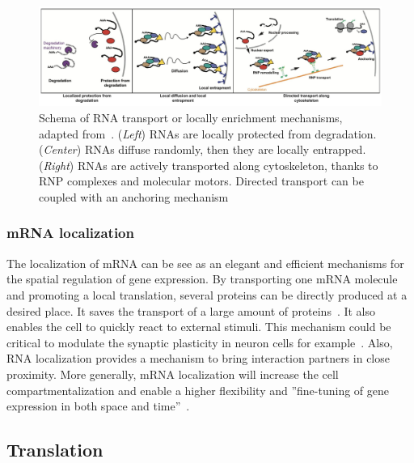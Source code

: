 \begin{figure}[]
    \centering
    \includegraphics[width=\textwidth]{figures/introduction/rna_transport}
    \caption[Schema of RNA transport or locally enrichment mechanisms]{Schema of RNA transport or locally enrichment mechanisms, adapted from~\cite{Medioni_2012}.
	(\textit{Left}) RNAs are locally protected from degradation.
	(\textit{Center}) RNAs diffuse randomly, then they are locally entrapped.
	(\textit{Right}) RNAs are actively transported along cytoskeleton, thanks to RNP complexes and molecular motors.
	Directed transport can be coupled with an anchoring mechanism}
    \label{fig:rna_transport}
\end{figure}

\subsubsection{mRNA localization}

The localization of \ac{mRNA} can be see as an elegant and efficient mechanisms for the spatial regulation of gene expression.
By transporting one \ac{mRNA} molecule and promoting a local translation, several proteins can be directly produced at a desired place.
It saves the transport of a large amount of proteins~\cite{Medioni_2012}.
It also enables the cell to quickly react to external stimuli.
This mechanism could be critical to modulate the synaptic plasticity in neuron cells for example~\cite{jung_axonal_2012}.
Also, \ac{RNA} localization provides a mechanism to bring interaction partners in close proximity.
More generally, \ac{mRNA} localization will increase the cell compartmentalization and enable a higher flexibility and ''fine-tuning of gene expression in both space and time''~\cite{Medioni_2012}.


\subsection{Translation}
\label{subsec:intro_translation}

